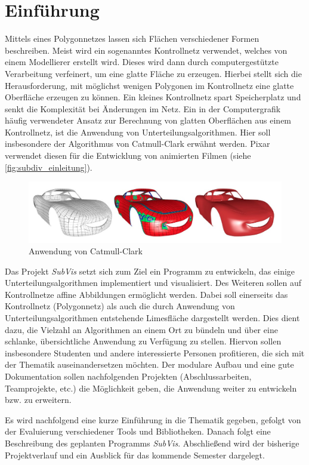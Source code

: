 \chapter{Einführung}

Mittels eines Polygonnetzes lassen sich Flächen verschiedener Formen beschreiben. 
Meist wird ein sogenanntes Kontrollnetz verwendet, welches von einem Modellierer erstellt wird.
Dieses wird dann durch computergestützte Verarbeitung verfeinert, um eine glatte Fläche zu erzeugen.
Hierbei stellt sich die Herausforderung, mit möglichst wenigen Polygonen im Kontrollnetz eine glatte Oberfläche erzeugen zu können.
Ein kleines Kontrollnetz spart Speicherplatz und senkt die Komplexität bei Änderungen im Netz.
Ein in der Computergrafik häufig verwendeter Ansatz zur Berechnung von glatten Oberflächen aus einem Kontrollnetz, ist die Anwendung von Unterteilungsalgorithmen.
Hier soll insbesondere der Algorithmus von Catmull-Clark erwähnt werden.
Pixar verwendet diesen für die Entwicklung von animierten Filmen (siehe \autoref{fig:subdiv_einleitung}).

\begin{figure}
  \centering
  \includegraphics[width=\textwidth]{content/media/sd_einleitung.jpg}
  \caption{Anwendung von Catmull-Clark \cite{niessner2012feature}}
  \label{fig:subdiv_einleitung}
\end{figure}


Das Projekt \emph{SubVis} setzt sich zum Ziel ein Programm zu entwickeln, das einige Unterteilungsalgorithmen implementiert und visualisiert. 
Des Weiteren sollen auf Kontrollnetze affine Abbildungen ermöglicht werden.
Dabei soll einerseits das Kontrollnetz (Polygonnetz) als auch die durch Anwendung von Unterteilungsalgorithmen entstehende Limesfläche dargestellt werden.
Dies dient dazu, die Vielzahl an Algorithmen an einem Ort zu bündeln und über eine schlanke, übersichtliche Anwendung zu Verfügung zu stellen.
Hiervon sollen insbesondere Studenten und andere interessierte Personen profitieren, die sich mit der Thematik auseinandersetzen möchten.
Der modulare Aufbau und eine gute Dokumentation sollen nachfolgenden Projekten (Abschlussarbeiten, Teamprojekte, etc.) die Möglichkeit geben, die Anwendung weiter zu entwickeln bzw. zu erweitern.

Es wird nachfolgend eine kurze Einführung in die Thematik gegeben, gefolgt von der Evaluierung verschiedener Tools und Bibliotheken. 
Danach folgt eine Beschreibung des geplanten Programms \emph{SubVis}.
Abschließend wird der bisherige Projektverlauf und ein Ausblick für das kommende Semester dargelegt.